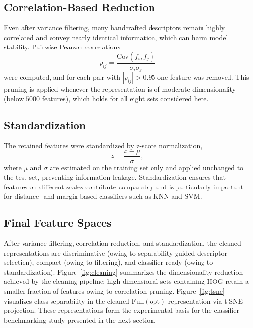 \subsection{Correlation-Based Reduction}

Even after variance filtering, many handcrafted descriptors remain highly
correlated and convey nearly identical information, which can harm model
stability. Pairwise Pearson correlations
\begin{equation}
\rho_{ij} = \frac{\mathrm{Cov}(f_i, f_j)}{\sigma_i \sigma_j}
\end{equation}
were computed, and for each pair with $|\rho_{ij}| > 0.95$ one feature was
removed. This pruning is applied whenever the representation is of moderate
dimensionality (below $5000$ features), which holds for all eight sets
considered here.

\subsection{Standardization}

The retained features were standardized by z-score normalization,
\begin{equation}
z = \frac{x - \mu}{\sigma},
\end{equation}
where $\mu$ and $\sigma$ are estimated on the training set only and applied
unchanged to the test set, preventing information leakage. Standardization
ensures that features on different scales contribute comparably and is
particularly important for distance- and margin-based classifiers such as KNN
and SVM.

\subsection{Final Feature Spaces}

After variance filtering, correlation reduction, and standardization, the cleaned
representations are discriminative (owing to separability-guided descriptor
selection), compact (owing to filtering), and classifier-ready (owing to
standardization). Figure~\ref{fig:cleaning} summarizes the dimensionality
reduction achieved by the cleaning pipeline; high-dimensional sets containing
HOG retain a smaller fraction of features owing to correlation pruning.
Figure~\ref{fig:tsne} visualizes class separability in the cleaned
$\mathrm{Full(opt)}$ representation via t-SNE projection. These representations
form the experimental basis for the classifier benchmarking study presented in
the next section.

